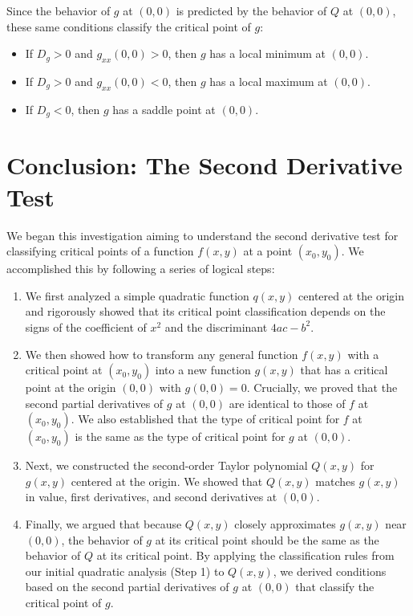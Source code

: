 \documentclass{article}
\begin{document}
Since the behavior of \( g \) at \( (0,0) \) is predicted by the behavior of \( Q \) at \( (0,0) \), these same conditions classify the critical point of \( g \):
\begin{itemize}
	\item If \( D_g > 0 \) and \( g_{xx}(0,0) > 0 \), then \( g \) has a local minimum at \( (0,0) \).
	\item If \( D_g > 0 \) and \( g_{xx}(0,0) < 0 \), then \( g \) has a local maximum at \( (0,0) \).
	\item If \( D_g < 0 \), then \( g \) has a saddle point at \( (0,0) \).
\end{itemize}

\newpage

\section{Conclusion: The Second Derivative Test}

We began this investigation aiming to understand the second derivative test for classifying critical points of a function \( f(x,y) \) at a point \( (x_0, y_0) \). We accomplished this by following a series of logical steps:
\begin{enumerate}
	\item We first analyzed a simple quadratic function \( q(x,y) \) centered at the origin and rigorously showed that its critical point classification depends on the signs of the coefficient of \( x^2 \) and the discriminant \( 4ac - b^2 \).
	\item We then showed how to transform any general function \( f(x,y) \) with a critical point at \( (x_0, y_0) \) into a new function \( g(x,y) \) that has a critical point at the origin \( (0,0) \) with \( g(0,0)=0 \). Crucially, we proved that the second partial derivatives of \( g \) at \( (0,0) \) are identical to those of \( f \) at \( (x_0, y_0) \). We also established that the type of critical point for \( f \) at \( (x_0, y_0) \) is the same as the type of critical point for \( g \) at \( (0,0) \).
	\item Next, we constructed the second-order Taylor polynomial \( Q(x,y) \) for \( g(x,y) \) centered at the origin. We showed that \( Q(x,y) \) matches \( g(x,y) \) in value, first derivatives, and second derivatives at \( (0,0) \).
	\item Finally, we argued that because \( Q(x,y) \) closely approximates \( g(x,y) \) near \( (0,0) \), the behavior of \( g \) at its critical point should be the same as the behavior of \( Q \) at its critical point. By applying the classification rules from our initial quadratic analysis (Step 1) to \( Q(x,y) \), we derived conditions based on the second partial derivatives of \( g \) at \( (0,0) \) that classify the critical point of \( g \).
\end{enumerate}
\end{document}

